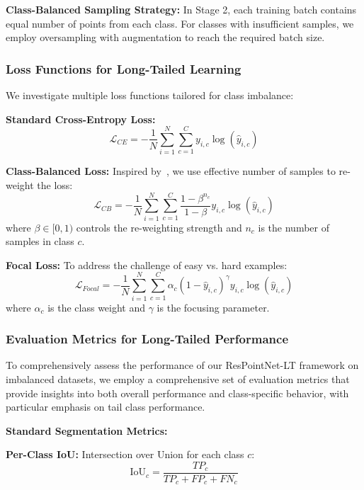 \documentclass[preprint,12pt]{elsarticle}
\begin{document}
\textbf{Class-Balanced Sampling Strategy:} In Stage 2, each training batch contains equal number of points from each class. For classes with insufficient samples, we employ oversampling with augmentation to reach the required batch size.

\subsubsection{Loss Functions for Long-Tailed Learning}
We investigate multiple loss functions tailored for class imbalance:

\textbf{Standard Cross-Entropy Loss:}
\begin{equation}
\mathcal{L}_{CE} = -\frac{1}{N}\sum_{i=1}^N\sum_{c=1}^C y_{i,c} \log(\hat{y}_{i,c})
\end{equation}

\textbf{Class-Balanced Loss:} Inspired by~\cite{cui2019class}, we use effective number of samples to re-weight the loss:
\begin{equation}
\mathcal{L}_{CB} = -\frac{1}{N}\sum_{i=1}^N\sum_{c=1}^C \frac{1-\beta^{n_c}}{1-\beta} y_{i,c} \log(\hat{y}_{i,c})
\end{equation}
where $\beta \in [0,1)$ controls the re-weighting strength and $n_c$ is the number of samples in class $c$.

\textbf{Focal Loss:} To address the challenge of easy vs. hard examples:
\begin{equation}
\mathcal{L}_{Focal} = -\frac{1}{N}\sum_{i=1}^N\sum_{c=1}^C \alpha_c (1-\hat{y}_{i,c})^\gamma y_{i,c} \log(\hat{y}_{i,c})
\end{equation}
where $\alpha_c$ is the class weight and $\gamma$ is the focusing parameter.

\subsubsection{Evaluation Metrics for Long-Tailed Performance}
To comprehensively assess the performance of our ResPointNet-LT framework on imbalanced datasets, we employ a comprehensive set of evaluation metrics that provide insights into both overall performance and class-specific behavior, with particular emphasis on tail class performance.

\textbf{Standard Segmentation Metrics:}

\textbf{Per-Class IoU:} Intersection over Union for each class $c$:
\begin{equation}
\label{eq:iou}
\text{IoU}_c = \frac{TP_c}{TP_c + FP_c + FN_c}
\end{equation}
\end{document}
